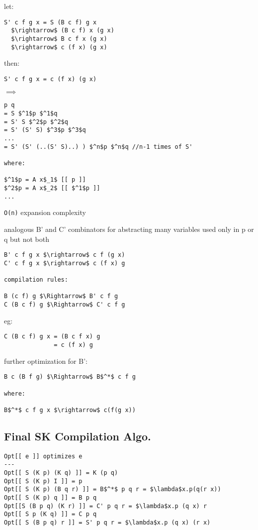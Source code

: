 \documentclass[8pt]{extarticle}
\begin{document}
\begin{multicols*}{2}
let:
\begin{lstlisting}
S' c f g x = S (B c f) g x
  $\rightarrow$ (B c f) x (g x)
  $\rightarrow$ B c f x (g x)
  $\rightarrow$ c (f x) (g x)
\end{lstlisting}

then:

\verb|S' c f g x = c (f x) (g x)|

$\implies$

\begin{lstlisting}
p q
= S $^1$p $^1$q
= S' S $^2$p $^2$q
= S' (S' S) $^3$p $^3$q
...
= S' (S' (..(S' S)..) ) $^n$p $^n$q //n-1 times of S'

where:

$^1$p = A x$_1$ [[ p ]]
$^2$p = A x$_2$ [[ $^1$p ]]
...
\end{lstlisting}

\verb|O(n)| expansion complexity

analogous B' and C' combinators for abstracting many variables used only in p or q but not both

\begin{lstlisting}
B' c f g x $\rightarrow$ c f (g x)
C' c f g x $\rightarrow$ c (f x) g

compilation rules:

B (c f) g $\Rightarrow$ B' c f g
C (B c f) g $\Rightarrow$ C' c f g
\end{lstlisting}

eg:

\begin{lstlisting}
C (B c f) g x = (B c f x) g
              = c (f x) g  
\end{lstlisting}

further optimization for B':

\begin{lstlisting}
B c (B f g) $\Rightarrow$ B$^*$ c f g

where:

B$^*$ c f g x $\rightarrow$ c(f(g x))
\end{lstlisting}

\subsection{Final SK Compilation Algo.}
\begin{lstlisting}
Opt[[ e ]] optimizes e
---
Opt[[ S (K p) (K q) ]] = K (p q)
Opt[[ S (K p) I ]] = p
Opt[[ S (K p) (B q r) ]] = B$^*$ p q r = $\lambda$x.p(q(r x))
Opt[[ S (K p) q ]] = B p q
Opt[[S (B p q) (K r) ]] = C' p q r = $\lambda$x.p (q x) r
Opt[[ S p (K q) ]] = C p q
Opt[[ S (B p q) r ]] = S' p q r = $\lambda$x.p (q x) (r x)


\end{lstlisting}
\end{multicols*}
\end{document}

